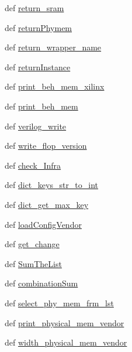 \begin{DoxyCompactItemize}
def \hyperlink{classsrc_1_1memgen_1_1memgen_aa0050e0a22252f7e384c119e070bce1b}{return\-\_\-sram}
\item 
def \hyperlink{classsrc_1_1memgen_1_1memgen_a0681965be20a0062d3eaadcdba9bb905}{return\-Phymem}
\item 
def \hyperlink{classsrc_1_1memgen_1_1memgen_a85176e62c531437610d2f4ff78c88658}{return\-\_\-wrapper\-\_\-name}
\item 
def \hyperlink{classsrc_1_1memgen_1_1memgen_a5bc41fbea19d110a3d33b24e31c865a2}{return\-Instance}
\item 
def \hyperlink{classsrc_1_1memgen_1_1memgen_a1d26ce2d4e6891997f96151beda1c58c}{print\-\_\-beh\-\_\-mem\-\_\-xilinx}
\item 
def \hyperlink{classsrc_1_1memgen_1_1memgen_a620aae8495d4a4c1693b25afa04bfb38}{print\-\_\-beh\-\_\-mem}
\item 
def \hyperlink{classsrc_1_1memgen_1_1memgen_ae6487f93777c02fee32b31a454624dbb}{verilog\-\_\-write}
\item 
def \hyperlink{classsrc_1_1memgen_1_1memgen_a0c78a65b6070a2534fcc073d7a21609f}{write\-\_\-flop\-\_\-version}
\item 
def \hyperlink{classsrc_1_1memgen_1_1memgen_a52cc0d75e69156fabc2972122f7ff354}{check\-\_\-\-Infra}
\item 
def \hyperlink{classsrc_1_1memgen_1_1memgen_a3492959db07f3a55e9af72e14d418561}{dict\-\_\-keys\-\_\-str\-\_\-to\-\_\-int}
\item 
def \hyperlink{classsrc_1_1memgen_1_1memgen_ac4211ad91cd714a45689cd37f3ff9541}{dict\-\_\-get\-\_\-max\-\_\-key}
\item 
def \hyperlink{classsrc_1_1memgen_1_1memgen_a818f3def00ab9bf245592e5132d75866}{load\-Config\-Vendor}
\item 
def \hyperlink{classsrc_1_1memgen_1_1memgen_aba3df88ebd9d333ec40ec608381ef4c2}{get\-\_\-change}
\item 
def \hyperlink{classsrc_1_1memgen_1_1memgen_ab289fce647c895e9e682a2dd1f0c7e2d}{Sum\-The\-List}
\item 
def \hyperlink{classsrc_1_1memgen_1_1memgen_a17569312d1ee937a621654d64d932660}{combination\-Sum}
\item 
def \hyperlink{classsrc_1_1memgen_1_1memgen_a79209eb604ffe3390382b49cb4e39d80}{select\-\_\-phy\-\_\-mem\-\_\-frm\-\_\-lst}
\item 
def \hyperlink{classsrc_1_1memgen_1_1memgen_ae69455398cb7b2848fa7b0b3f14075fb}{print\-\_\-physical\-\_\-mem\-\_\-vendor}
\item 
def \hyperlink{classsrc_1_1memgen_1_1memgen_ac45810e93bb638826e8c38fbc9c1de39}{width\-\_\-physical\-\_\-mem\-\_\-vendor}

\end{DoxyCompactItemize}
